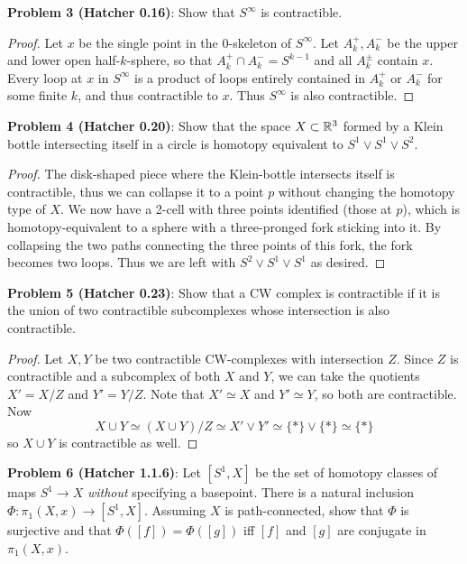\documentclass{amsart}
\begin{document}
\newpage 


\noindent \textbf{Problem 3 (Hatcher 0.16)}: Show that $S^{\infty}$ is contractible.
\begin{proof}
	Let $x$ be the single point in the $0$-skeleton of $S^{\infty}$. Let $A_k^+,A_k^-$ be the upper and lower open half-$k$-sphere, so that $A_k^+\cap A_k^-=S^{k-1}$ and all $A_k^{\pm}$ contain $x$. Every loop at $x$ in $S^{\infty}$ is a product of loops entirely contained in $A_k^+$ or $A_k^-$ for some finite $k$, and thus contractible to $x$. Thus $S^{\infty}$ is also contractible.
\end{proof}
\newpage 


\noindent \textbf{Problem 4 (Hatcher 0.20)}: Show that the space $X\subset \mathbb{R}^3$ formed by a Klein bottle intersecting itself in a circle is homotopy equivalent to $S^1\vee S^1 \vee S^2$.
\begin{proof}
	The disk-shaped piece where the Klein-bottle intersects itself is contractible, thus we can collapse it to a point $p$ without changing the homotopy type of $X$. We now have a 2-cell with three points identified (those at $p$), which is homotopy-equivalent to a sphere with a three-pronged fork sticking into it. By collapsing the two paths connecting the three points of this fork, the fork becomes two loops. Thus we are left with $S^2\vee S^1\vee S^1$ as desired.
\end{proof}
\newpage 


\noindent \textbf{Problem 5 (Hatcher 0.23)}: Show that a CW complex is contractible if it is the union of two contractible subcomplexes whose intersection is also contractible.

\begin{proof}
	Let $X,Y$ be two contractible CW-complexes with intersection $Z$. Since $Z$ is contractible and a subcomplex of both $X$ and $Y$, we can take the quotients $X'=X/Z$ and $Y'=Y/Z$. Note that $X'\simeq X$ and $Y'\simeq Y$, so both are contractible. Now 
	$$X\cup Y \simeq (X\cup Y)/ Z \simeq X'\vee Y' \simeq \{\ast\}\vee \{\ast\} \simeq \{\ast\}$$ 
	so $X\cup Y$ is contractible as well.
\end{proof}

\newpage 


\noindent \textbf{Problem 6 (Hatcher 1.1.6)}: Let $[S^1,X]$ be the set of homotopy classes of maps $S^1\to X$ \textit{without} specifying a basepoint. 
There is a natural inclusion $\Phi:\pi_1(X,x)\to [S^1,X]$. Assuming $X$ is path-connected, show that $\Phi$ is surjective and that $\Phi([f])=\Phi([g])$ iff $[f]$ and $[g]$ are conjugate in $\pi_1(X,x)$. 
\end{document}
